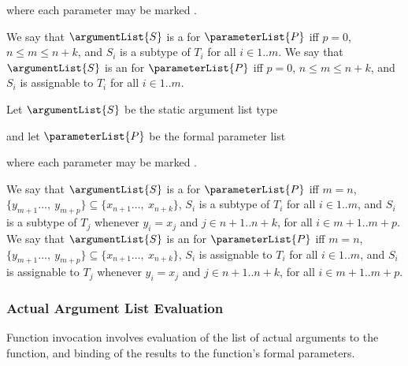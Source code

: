\documentclass[makeidx]{article}
\begin{document}
{\noindent
{}

\noindent
where each parameter may be marked \COVARIANT{}
.

\LMHash{}%
We say that $\argumentList{S}$ is
a  for $\parameterList{P}$
if{}f $p = 0$, $n \leq m \leq n+k$, and $S_i$ is
a subtype of $T_i$ for all $i \in 1 .. m$.
We say that $\argumentList{S}$ is
an  for $\parameterList{P}$
if{}f $p = 0$, $n \leq m \leq n+k$, and $S_i$ is
assignable to $T_i$ for all $i \in 1 .. m$.

\LMHash{}%
Let $\argumentList{S}$ be the static argument list type

\noindent
{}

\noindent
and let $\parameterList{P}$ be the formal parameter list

\noindent
{}

\noindent
where each parameter may be marked \COVARIANT{}
.

\LMHash{}%
We say that $\argumentList{S}$ is
a  for $\parameterList{P}$
if{}f $m = n$,
$\{y_{m+1}\ldots,\ y_{m+p}\} \subseteq \{x_{n+1}\ldots,\ x_{n+k}\}$,
$S_i$ is a subtype of $T_i$ for all $i \in 1 .. m$,
and $S_i$ is a subtype of $T_j$ whenever $y_i = x_j$ and
$j \in n + 1 .. n + k$, for all
$i \in m + 1 .. m + p$.
We say that $\argumentList{S}$
is an  for $\parameterList{P}$
if{}f $m = n$,
$\{y_{m+1}\ldots,\ y_{m+p}\} \subseteq \{x_{n+1}\ldots,\ x_{n+k}\}$,
$S_i$ is assignable to $T_i$ for all $i \in 1 .. m$,
and $S_i$ is assignable to $T_j$ whenever $y_i = x_j$ and
$j \in n + 1 .. n + k$, for all
$i \in m + 1 .. m + p$.



\subsubsection{Actual Argument List Evaluation}

\LMHash{}%
Function invocation involves evaluation of
the list of actual arguments to the function,
and binding of the results to the function's formal parameters.

}
\end{document}

